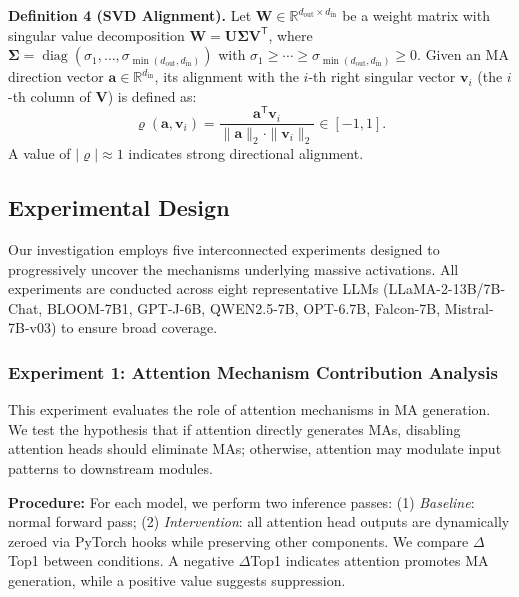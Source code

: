 \documentclass[conference]{IEEEtran}
\begin{document}
\vspace{0.5em}
\noindent\textbf{Definition 4 (SVD Alignment).} Let $\mathbf{W} \in \mathbb{R}^{d_{\text{out}} \times d_{\text{in}}}$ be a weight matrix with singular value decomposition $\mathbf{W} = \mathbf{U}\boldsymbol{\Sigma}\mathbf{V}^{\mathsf{T}}$, where $\boldsymbol{\Sigma} = \operatorname{diag}(\sigma_1, \dots, \sigma_{\min(d_{\text{out}},d_{\text{in}})})$ with $\sigma_1 \geq \cdots \geq \sigma_{\min(d_{\text{out}},d_{\text{in}})} \geq 0$. Given an MA direction vector $\mathbf{a} \in \mathbb{R}^{d_{\text{in}}}$, its alignment with the $i$-th right singular vector $\mathbf{v}_i$ (the $i$-th column of $\mathbf{V}$) is defined as:
\begin{equation}
\varrho(\mathbf{a}, \mathbf{v}_i) = \frac{\mathbf{a}^{\mathsf{T}}\mathbf{v}_i}{\|\mathbf{a}\|_2 \cdot \|\mathbf{v}_i\|_2} \in [-1, 1].
\end{equation}
A value of $|\varrho| \approx 1$ indicates strong directional alignment.

\subsection{Experimental Design}

Our investigation employs five interconnected experiments designed to progressively uncover the mechanisms underlying massive activations. All experiments are conducted across eight representative LLMs (LLaMA-2-13B/7B-Chat, BLOOM-7B1, GPT-J-6B, QWEN2.5-7B, OPT-6.7B, Falcon-7B, Mistral-7B-v03) to ensure broad coverage.

\subsubsection{Experiment 1: Attention Mechanism Contribution Analysis}

This experiment evaluates the role of attention mechanisms in MA generation. We test the hypothesis that if attention directly generates MAs, disabling attention heads should eliminate MAs; otherwise, attention may modulate input patterns to downstream modules. 

\textbf{Procedure:} For each model, we perform two inference passes: (1) \textit{Baseline}: normal forward pass; (2) \textit{Intervention}: all attention head outputs are dynamically zeroed via PyTorch hooks while preserving other components. We compare $\Delta$Top1 between conditions. A negative $\Delta$Top1 indicates attention promotes MA generation, while a positive value suggests suppression.
\end{document}
